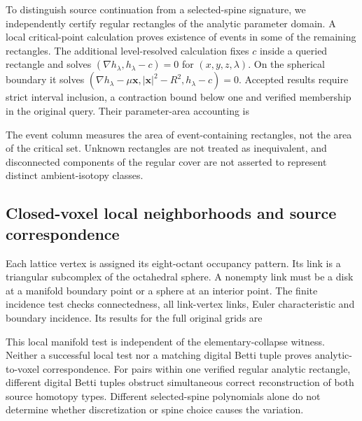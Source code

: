 To distinguish source continuation from a selected-spine signature, we independently certify regular rectangles of the analytic parameter domain. A local critical-point calculation proves existence of events in some of the remaining rectangles. The additional level-resolved calculation fixes $c$ inside a queried rectangle and solves $(\nabla h_\lambda,h_\lambda-c)=0$ for $(x,y,z,\lambda)$. On the spherical boundary it solves $(\nabla h_\lambda-\mu\mathbf{x},|\mathbf{x}|^2-R^2,h_\lambda-c)=0$. Accepted results require strict interval inclusion, a contraction bound below one and verified membership in the original query. Their parameter-area accounting is
\begin{center}\end{center}
The event column measures the area of event-containing rectangles, not the area of the critical set. Unknown rectangles are not treated as inequivalent, and disconnected components of the regular cover are not asserted to represent distinct ambient-isotopy classes.

\subsection{Closed-voxel local neighborhoods and source correspondence}
Each lattice vertex is assigned its eight-octant occupancy pattern. Its link is a triangular subcomplex of the octahedral sphere. A nonempty link must be a disk at a manifold boundary point or a sphere at an interior point. The finite incidence test checks connectedness, all link-vertex links, Euler characteristic and boundary incidence. Its results for the full original grids are
\begin{center}\end{center}
This local manifold test is independent of the elementary-collapse witness. Neither a successful local test nor a matching digital Betti tuple proves analytic-to-voxel correspondence. For pairs within one verified regular analytic rectangle, different digital Betti tuples obstruct simultaneous correct reconstruction of both source homotopy types. Different selected-spine polynomials alone do not determine whether discretization or spine choice causes the variation.

